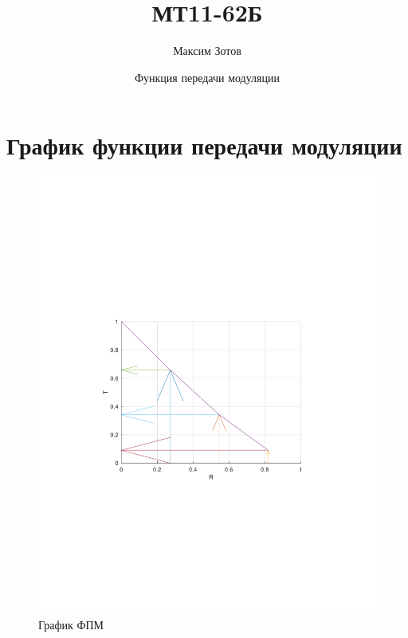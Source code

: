 \documentclass[14pt,a4paper]{extarticle}
\author{Максим Зотов}
\title{МТ11-62Б}
\date{Функция передачи модуляции}
\begin{document}
\maketitle
\tableofcontents
\pagebreak
\section{График функции передачи модуляции}
\begin{figure}[H]
	\begin{center}
		\includegraphics[trim=130 270 130 250,clip, width=\textwidth]{func_mod.pdf}\caption{График ФПМ}\label{fpm}
	\end{center}
\end{figure}
\end{document}
